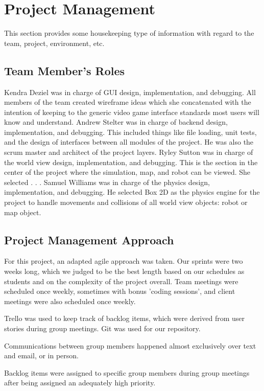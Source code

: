 

\chapter{Project Management}
This section provides some housekeeping type of information with regard to the 
team, project, environment, etc. 



\section{Team Member's Roles}
Kendra Deziel was in charge of GUI design, implementation, and debugging. All members of the team created wireframe ideas which she concatenated with the intention of keeping to the generic video game interface standards most users will know and understand.
Andrew Stelter was in charge of backend design, implementation, and debugging. This included things like file loading, unit tests, and the design of interfaces between all modules of the project. He was also the scrum master and architect of the project layers.
Ryley Sutton was in charge of the world view design, implementation, and debugging. This is the section in the center of the project where the simulation, map, and robot can be viewed. She selected . . . 
Samuel Williams was in charge of the physics design, implementation, and debugging. He selected Box 2D as the physics engine for the project to handle movements and collisions of all world view objects: robot or map object.


\section{Project  Management Approach}
For this project, an adapted agile approach was taken. Our sprints were two weeks long, which we judged to be the best length based on our schedules as students and on the complexity of the project overall. Team meetings were scheduled once weekly, sometimes with bonus 'coding sessions', and client meetings were also scheduled once weekly. 

Trello was used to keep track of backlog items, which were derived from user stories during group meetings. Git was used for our repository.

Communications between group members happened almost exclusively over text and email, or in person.

Backlog items were assigned to specific group members during group meetings after being assigned an adequately high priority.


